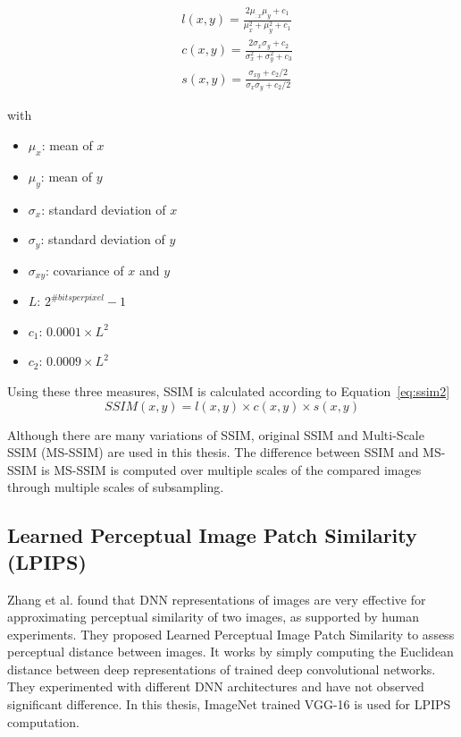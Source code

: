\begin{equation}
    \label{eq:ssim1}
    \begin{aligned}
         & l(x, y)=\frac{2 \mu_{: x} \mu_{y}+c_{1}}{\mu_{x}^{2}+\mu_{y}^{2}+c_{1}}           \\
         & c(x, y)=\frac{2 \sigma_{x} \sigma_{y}+c_{2}}{\sigma_{x}^{2}+\sigma_{y}^{2}+c_{3}} \\
         & s(x, y)=\frac{\sigma_{x y}+c_{2}/2}{\sigma_{x} \sigma_{y}+c_{2}/2}
    \end{aligned}
\end{equation}

with
\begin{itemize}
    \item \(\mu_x\): mean of \(x\)
    \item \(\mu_y\): mean of \(y\)
    \item \(\sigma_x\): standard deviation of \(x\)
    \item \(\sigma_y\): standard deviation of \(y\)
    \item \(\sigma_{xy}\): covariance of \(x\) and \(y\)
    \item \(L\): \(2^{\#bits per pixel}-1\)
    \item \(c_1\): \(0.0001 \times L^2\)
    \item \(c_2\): \(0.0009 \times L^2\)
\end{itemize}

Using these three measures, SSIM is calculated according to Equation~\ref{eq:ssim2}
\begin{equation}
    \label{eq:ssim2}
    SSIM(x,y) = l(x,y) \times c(x,y) \times s(x,y)
\end{equation}

Although there are many variations of SSIM, original SSIM and Multi-Scale SSIM (MS-SSIM) are used in this thesis. The difference between SSIM and MS-SSIM is MS-SSIM is computed over multiple scales of the compared images through multiple scales of subsampling.

\subsection{Learned Perceptual Image Patch Similarity (LPIPS)}
Zhang et al. found that DNN representations of images are very effective for approximating perceptual similarity of two images, as supported by human experiments. They proposed Learned Perceptual Image Patch Similarity to assess perceptual distance between images. It works by simply computing the Euclidean distance between deep representations of trained deep convolutional networks. They experimented with different DNN architectures and have not observed significant difference. In this thesis, ImageNet trained VGG-16 is used for LPIPS computation.

